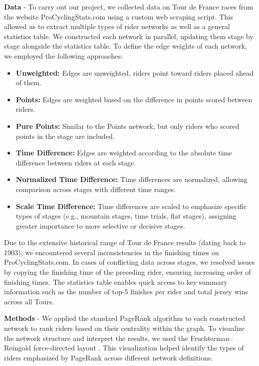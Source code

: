 \documentclass[9pt,twocolumn,twoside]{pnas-report}
\begin{document}
\textbf{Data} - To carry out our project, we collected data on Tour de France races from the website ProCyclingStats.com using a custom web scraping script. This allowed us to extract multiple types of rider networks as well as a general statistics table. We constructed each network in parallel, updating them stage by stage alongside the statistics table.
To define the edge weights of each network, we employed the following approaches:
\begin{itemize}
	\item \textbf{Unweighted:} Edges are unweighted, riders point toward riders placed ahead of them.
	\item \textbf{Points:} Edges are weighted based on the difference in points scored between riders.
    \item \textbf{Pure Points:} Similar to the Points network, but only riders who scored points in the stage are included.
    \item \textbf{Time Difference:} Edges are weighted according to the absolute time difference between riders at each stage.
    \item \textbf{Normalized Time Difference:} Time differences are normalized, allowing comparison across stages with different time ranges.
    \item \textbf{Scale Time Difference:} Time differences are scaled to emphasize specific types of stages (e.g., mountain stages, time trials, flat stages), assigning greater importance to more selective or decisive stages.
\end{itemize} \par
Due to the extensive historical range of Tour de France results (dating back to 1903), we encountered several inconsistencies in the finishing times on ProCyclingStats.com. In cases of conflicting data across stages, we resolved issues by copying the finishing time of the preceding rider, ensuring increasing order of finishing times.
The statistics table enables quick access to key summary information such as the number of top-5 finishes per rider and total jersey wins across all Tours. \par
\textbf{Methods} - We applied the standard PageRank algorithm to each constructed network to rank riders based on their centrality within the graph. To visualize the network structure and interpret the results, we used the Fruchterman–Reingold force-directed layout \cite{Fruchterman1991}. This visualization helped identify the types of riders emphasized by PageRank across different network definitions.
\end{document}
